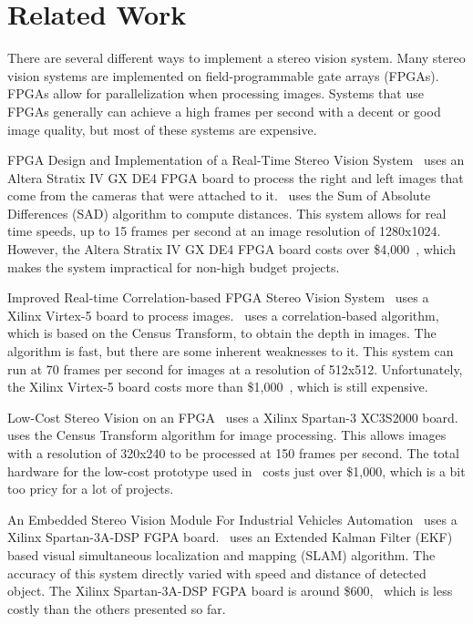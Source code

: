 \chapter{Related Work}

There are several different ways to implement a stereo vision system. Many stereo vision systems are implemented on field-programmable gate arrays (FPGAs). FPGAs allow for parallelization when processing images. Systems that use FPGAs generally can achieve a high frames per second with a decent or good image quality, but most of these systems are expensive. 

FPGA Design and Implementation of a Real-Time Stereo Vision System~\cite{alteraStratixIVPaper} uses an Altera Stratix IV GX DE4 FPGA board to process the right and left images that come from the cameras that were attached to it.~\cite{alteraStratixIVPaper} uses the Sum of Absolute Differences (SAD) algorithm to compute distances. This system allows for real time speeds, up to 15 frames per second at an image resolution of 1280x1024. However, the Altera Stratix IV GX DE4 FPGA board costs over \$4,000~\cite{alteraStratixIVBoard}, which makes the system impractical for non-high budget projects.

Improved Real-time Correlation-based FPGA Stereo Vision System~\cite{xilinxVirtex5Paper} uses a Xilinx Virtex-5 board to process images.~\cite{xilinxVirtex5Paper} uses a correlation-based algorithm, which is based on the Census Transform, to obtain the depth in images. The algorithm is fast, but there are some inherent weaknesses to it. This system can run at 70 frames per second for images at a resolution of 512x512. Unfortunately, the Xilinx Virtex-5 board costs more than \$1,000~\cite{xilinxVirtex5Board}, which is still expensive.

Low-Cost Stereo Vision on an FPGA~\cite{lowCost1000} uses a Xilinx Spartan-3 XC3S2000 board.~\cite{lowCost1000} uses the Census Transform algorithm for image processing. This allows images with a resolution of 320x240 to be processed at 150 frames per second. The total hardware for the low-cost prototype used in~\cite{lowCost1000} costs just over \$1,000, which is a bit too pricy for a lot of projects.

An Embedded Stereo Vision Module For Industrial Vehicles Automation~\cite{xilinxSpartan3APaper} uses a Xilinx Spartan-3A-DSP FGPA board.~\cite{xilinxSpartan3APaper} uses an Extended Kalman Filter (EKF) based visual simultaneous localization and mapping (SLAM) algorithm. The accuracy of this system directly varied with speed and distance of detected object. The Xilinx Spartan-3A-DSP FGPA board is  around \$600,~\cite{xilinxSpartan3ABoard} which is less costly than the others presented so far.

